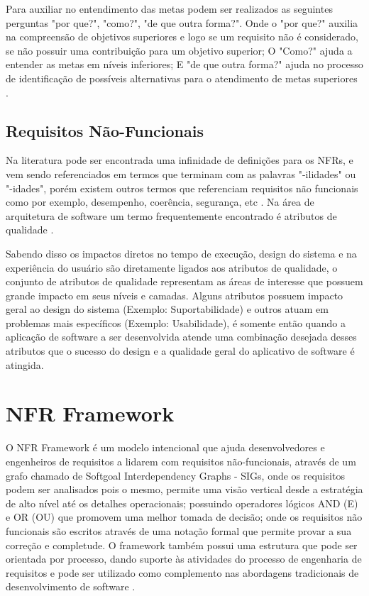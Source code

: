 Para auxiliar no entendimento das metas podem ser realizados as seguintes perguntas "por que?", "como?", "de que outra forma?"\cite{van2001goal}. Onde o "por que?" auxilia na compreensão de objetivos superiores e logo se um requisito não é considerado, se não possuir uma contribuição para um objetivo superior; O "Como?" ajuda a entender as metas em níveis inferiores\cite{yu1998goal}; E "de que outra forma?" ajuda no processo de identificação de possíveis alternativas para o atendimento de metas superiores \cite{van2001goal}.  

\subsection{Requisitos Não-Funcionais}

Na literatura pode ser encontrada uma infinidade de definições para os NFRs, e vem sendo referenciados em termos que terminam com as palavras "-ilidades" ou "-idades", porém existem outros termos que referenciam requisitos não funcionais como por exemplo, desempenho, coerência, segurança, etc \cite{chung2012non}. Na área de arquitetura de software um termo frequentemente encontrado é atributos de qualidade \cite{barbacci1995quality}.

Sabendo disso os impactos diretos no tempo de execução, design do sistema e na experiência do usuário são diretamente ligados aos atributos de qualidade, o conjunto de atributos de qualidade representam as áreas de interesse que possuem grande impacto em seus níveis e camadas. Alguns atributos possuem impacto geral ao design do sistema (Exemplo: Suportabilidade) e outros atuam em problemas mais específicos (Exemplo: Usabilidade), é somente então quando a aplicação de software a ser desenvolvida atende uma combinação desejada desses atributos que o sucesso do design e a qualidade geral do aplicativo de software é atingida\cite{microsoft2009}.


\section{NFR Framework}

O NFR Framework é um modelo intencional que ajuda desenvolvedores e engenheiros de requisitos a lidarem com requisitos não-funcionais, através de um grafo chamado de Softgoal Interdependency Graphs - SIGs, onde os requisitos podem ser analisados pois o mesmo, permite uma visão vertical desde a estratégia de alto nível até os detalhes operacionais;  possuindo operadores lógicos AND (E) e OR (OU) que promovem uma melhor tomada de decisão; onde  os requisitos não funcionais são escritos através de uma notação formal que permite provar a sua correção e completude. O framework também possui uma estrutura que pode ser orientada por processo, dando suporte às atividades do processo de engenharia de requisitos e pode ser utilizado como complemento nas abordagens tradicionais de desenvolvimento de software \cite{chung2012non}.

